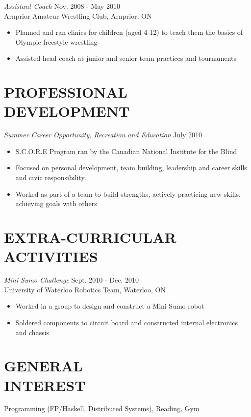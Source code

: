 \documentclass[margin]{res}
\begin{document}
\begin{resume}
{\sl Assistant Coach} \hfill Nov. 2008 - May 2010\\
Arnprior Amateur Wrestling Club, Arnprior, ON
\begin{itemize}\itemsep -2pt
  \item Planned and ran clinics for children (aged 4-12) to teach them the basics of Olympic freestyle wrestling
  \item Assisted head coach at junior and senior team practices and tournaments
\end{itemize}

\section{PROFESSIONAL DEVELOPMENT}
{\sl Summer Career Opportunity, Recreation and Education} \hfill July 2010
\begin{itemize} \itemsep -2pt
  \item S.C.O.R.E Program ran by the Canadian National Institute for the Blind
  \item Focused on personal development, team building, leadership and career skills and civic responsibility.
  \item Worked as part of a team to build strengths, actively practicing new skills, achieving goals with others
\end{itemize}

\section{EXTRA-CURRICULAR \\ ACTIVITIES}
{\it Mini Sumo Challenge}  \hfill Sept. 2010 - Dec. 2010\\
University of Waterloo Robotics Team, Waterloo, ON
\begin{itemize} \itemsep -2pt
  \item Worked in a group to design and construct a Mini Sumo robot
  \item Soldered components to circuit board and constructed internal electronics and chassis
\end{itemize}

\section{GENERAL\\INTEREST}
Programming (FP/Haskell, Distributed Systems), Reading, Gym

\end{resume}
\end{document}
